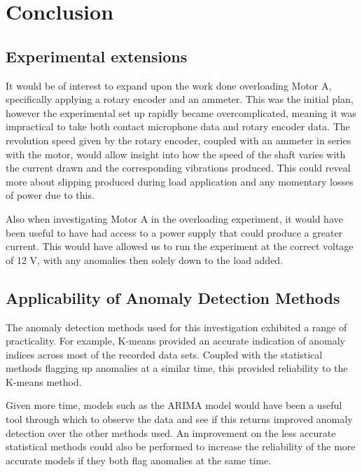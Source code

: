 \section{Conclusion}
\label{sec:conclusion}

\subsection{Experimental extensions }

It would be of interest to expand upon the work done overloading Motor A, specifically applying a rotary encoder and an ammeter. This was the initial plan, however the experimental set up rapidly became overcomplicated, meaning it was impractical to take both contact microphone data and rotary encoder data. The revolution speed given by the rotary encoder, coupled with an ammeter in series with the motor, would allow insight into how the speed of the shaft varies with the current drawn and the corresponding vibrations produced. This could reveal more about slipping produced during load application and any momentary losses of power due to this. 


Also when investigating Motor A in the overloading experiment, it would have been useful to have had access to a power supply that could produce a greater current. This would have allowed us to run the experiment at the correct voltage of 12 V, with any anomalies then solely down to the load added.


\subsection{Applicability of Anomaly Detection Methods}

The anomaly detection methods used for this investigation exhibited a range of practicality. For example, K-means provided an accurate indication of anomaly indices across most of the recorded data sets. Coupled with the statistical methods flagging up anomalies at a similar time, this provided reliability to the K-means method.

Given more time, models such as the ARIMA model would have been a useful tool through which to observe the data and see if this returns improved anomaly detection over the other methods used. An improvement on the less accurate statistical methods could also be performed to increase the reliability of the more accurate models if they both flag anomalies at the same time.

